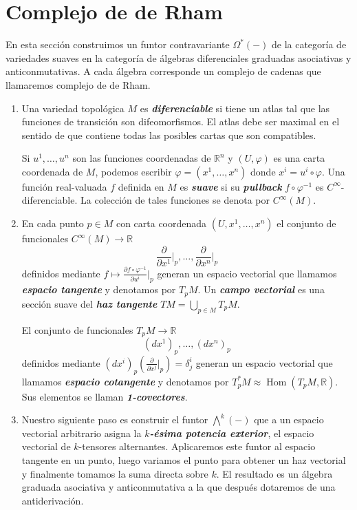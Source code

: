 \documentclass[spanish]{article}
\theoremstyle{definition}
\newcommand{\R}{\mathbb{R}}
\newcommand{\Cinf}{C^\infty}
\DeclareMathOperator{\Hom}{Hom}
\begin{document}
	\section{Complejo de de Rham}\label{sec:2}
	En esta sección construimos un funtor contravariante $\Omega^*(-)$ de la categoría de variedades suaves en la categoría de álgebras diferenciales graduadas asociativas y anticonmutativas. A cada álgebra corresponde un complejo de cadenas que llamaremos complejo de de Rham.
	\begin{enumerate}
		\item Una variedad topológica $M$ es \textbf{\textit{diferenciable}} si tiene un atlas tal que las funciones de transición son difeomorfismos. 
		El atlas debe ser maximal en el sentido de que contiene todas las posibles cartas que son compatibles.
		
		Si $u^1,\ldots,u^n$ son las funciones coordenadas de $\R^n$ y $(U,\varphi)$ es una carta coordenada de $M$, podemos escribir $\varphi=(x^1,\ldots,x^n)$ donde  $x^i=u^i\circ\varphi$. Una función real-valuada $f$ definida en $M$ es \textbf{\textit{suave}} si su \textbf{\textit{pullback}} $f\circ\varphi^{-1}$ es $\Cinf$-diferenciable. La colección de tales funciones se denota por $\Cinf(M)$.
		
		\item En cada punto $p\in M$ con carta coordenada $(U,x^1,\ldots,x^n)$ el conjunto de funcionales $\Cinf(M)\to \R$
		\[\frac{\partial}{\partial x^1}\Big|_p,\ldots,\frac{\partial}{\partial x^n}\Big|_p\]
		definidos mediante $f\mapsto \frac{\partial f\circ\varphi^{-1}}{\partial u^i}\Big|_p$ generan un espacio vectorial que llamamos \textbf{\textit{espacio tangente}} y denotamos por $T_pM$. Un \textbf{\textit{campo vectorial}} es una sección suave del \textbf{\textit{haz tangente}} $TM=\bigcup_{p\in M}T_pM$.
		
		El conjunto de funcionales $T_pM\to \R$
		\[(dx^1)_p,\ldots,(dx^n)_p\]
		definidos mediante $(dx^i)_p\left(\frac{\partial}{\partial x^j}\Big|_p\right)=\delta_j^i$ generan un espacio vectorial que llamamos \textbf{\textit{espacio cotangente}} y denotamos por $T_p^*M\approx\Hom(T_pM,\R)$. Sus elementos se llaman \textbf{\textit{1-covectores}}.
		
		\item Nuestro siguiente paso es construir el funtor $\bigwedge^k(-)$ que a un espacio vectorial arbitrario asigna la \textbf{\textit{$k$-ésima potencia exterior}}, el espacio vectorial de $k$-tensores alternantes. Aplicaremos este funtor al espacio tangente en un punto, luego variamos el punto para obtener un haz vectorial y finalmente tomamos la suma directa sobre $k$. El resultado es un álgebra graduada asociativa y anticonmutativa a la que después dotaremos de una antiderivación.
		

\end{enumerate}
\end{document}
